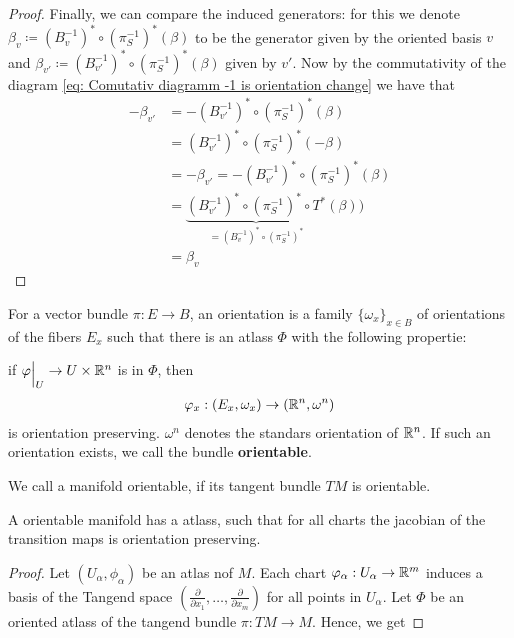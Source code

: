 \begin{proof}
Finally, we can compare the induced generators: for this we denote $\beta_v\coloneq (B_{v}^{-1})^*\circ (\pi^{-1}_S)^*(\beta)$ to be the generator given by the oriented basis $v$ and $\beta_{v'}\coloneq (B_{v'}^{-1})^*\circ (\pi^{-1}_S)^*(\beta)$ given by $v'$. Now by the commutativity of the diagram \ref{eq: Comutativ diagramm -1 is orientation change} we have that 
\begin{align*}
    -\beta_{v'} 
    &= -(B_{v'}^{-1})^*\circ (\pi^{-1}_S)^*(\beta) \\
    &= (B_{v'}^{-1})^*\circ (\pi^{-1}_S)^*(-\beta)\\
    &= -\beta_{v'}=-(B_{v'}^{-1})^*\circ (\pi^{-1}_S)^*(\beta)\\
    &= \underbrace{(B_{v'}^{-1})^*\circ (\pi^{-1}_S)^*\circ T^*}_{=(B_{v}^{-1})^*\circ (\pi^{-1}_S)^*}(\beta))\\
    &= \beta_v
\end{align*}
\end{proof}
\begin{definition}
For a  vector bundle $\pi:E\to B$, an orientation is a family $\{ \omega_x \}_{x\in B}$ of orientations of the fibers $E_x$ such that there is an atlass $\Phi$ with the following propertie:

if $\phi \einsch{U}\to U\times \R^n$ is in $\Phi$, then 
\begin{align*}
	\varphi_x : (E_x,\omega_x) \to (\mathbb{R}^n,\omega^n)
\end{align*} is orientation preserving. $\omega^n$ denotes the standars orientation of $\mathbb{R}^n$. If such an orientation exists, we call the bundle \textbf{orientable}.
\end{definition}
\begin{definition}
	We call a manifold orientable, if its tangent bundle $TM$ is orientable. 
\end{definition}
\begin{cor}
	A orientable manifold has a atlass, such that for all charts the jacobian of the transition maps is orientation preserving.
\end{cor}
\begin{proof}
	Let $(U_{\alpha},\phi_\alpha)$ be an atlas nof $M$. Each chart $\varphi_\alpha:U_\alpha \to \mathbb{R}^m$ induces a basis of the Tangend space $(\frac{\partial}{\partial x_1},\dots , \frac{\partial}{\partial x_m})$ for all points in $U_\alpha$.  	
	Let $\Phi$ be an oriented atlass of the tangend bundle $\pi:TM\to M$. Hence, we get 
\end{proof}